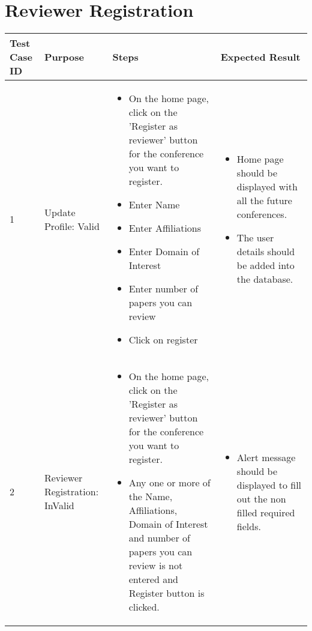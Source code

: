 \documentclass[english,a4paper,12pt]{report}
\begin{document}
\section{Reviewer Registration}
\begin{longtable} { | p{2cm} | p{3cm}| p{6cm}| p{6cm} |} 
\hline 
\textbf{Test Case ID} & \textbf{Purpose}  & \textbf{Steps} &\textbf{Expected Result} \\
\hline 1 &  Update Profile: Valid
&
\vspace{-5mm}
\begin{itemize}
\item On the home page, click on the 'Register as reviewer' button for the conference you want to register.
\item Enter Name
\item Enter Affiliations
\item Enter Domain of Interest
\item Enter number of papers you can review
\item Click on register 
\end{itemize}& 
\vspace{-5mm}
\begin{itemize}
\item Home page should be displayed with all the future conferences.
\item The user details should be added into the database.
\end{itemize}\\
\hline 2 &  Reviewer Registration: InValid & 
\vspace{-5mm}
\begin{itemize}
\item On the home page, click on the 'Register as reviewer' button for the conference you want to register.
\item Any one or more of the Name, Affiliations, Domain of Interest and number of papers you can review is not entered and Register button is clicked.
\end{itemize}
&
\vspace{-5mm}
\begin{itemize}
\item Alert message should be displayed to fill out the non filled required fields.
\end{itemize}\\ 
\hline  
\end{longtable}
\end{document}
